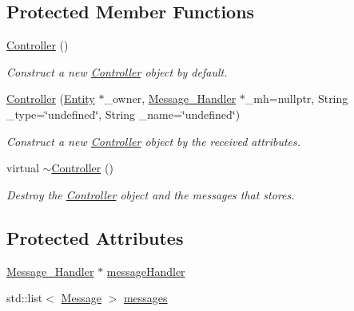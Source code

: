 \subsection*{Protected Member Functions}
\begin{DoxyCompactItemize}
\item 
\mbox{\hyperlink{classbanita_1_1_controller_a4455be6d7e7fc0dcb4d5919b45432020}{Controller}} ()
\begin{DoxyCompactList}\small\item\em Construct a new \mbox{\hyperlink{classbanita_1_1_controller}{Controller}} object by default. \end{DoxyCompactList}\item 
\mbox{\hyperlink{classbanita_1_1_controller_a9c45447d14400317d8419bbca3bad54a}{Controller}} (\mbox{\hyperlink{classbanita_1_1_entity}{Entity}} $\ast$\+\_\+owner, \mbox{\hyperlink{classbanita_1_1_message___handler}{Message\+\_\+\+Handler}} $\ast$\+\_\+mh=nullptr, String \+\_\+type=\char`\"{}undefined\char`\"{}, String \+\_\+name=\char`\"{}undefined\char`\"{})
\begin{DoxyCompactList}\small\item\em Construct a new \mbox{\hyperlink{classbanita_1_1_controller}{Controller}} object by the received attributes. \end{DoxyCompactList}\item 
virtual \mbox{\hyperlink{classbanita_1_1_controller_a355eaba3604cfca01437009c23c1cb41}{$\sim$\+Controller}} ()
\begin{DoxyCompactList}\small\item\em Destroy the \mbox{\hyperlink{classbanita_1_1_controller}{Controller}} object and the messages that stores. \end{DoxyCompactList}\end{DoxyCompactItemize}
\subsection*{Protected Attributes}
\begin{DoxyCompactItemize}
\item 
\mbox{\hyperlink{classbanita_1_1_message___handler}{Message\+\_\+\+Handler}} $\ast$ \mbox{\hyperlink{classbanita_1_1_controller_aa92dd1db0f265962029842ee6495c2cc}{message\+Handler}}
\item 
std\+::list$<$ \mbox{\hyperlink{classbanita_1_1_message}{Message}} $>$ \mbox{\hyperlink{classbanita_1_1_controller_ab4ca85fe5f2645708b89934f394ad449}{messages}}
\end{DoxyCompactItemize}


